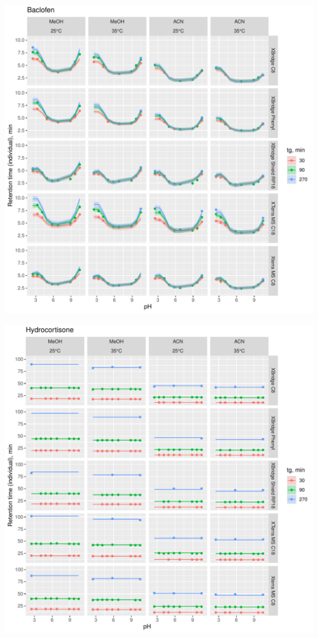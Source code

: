 \documentclass[
]{article}
\begin{document}
\includegraphics{../figures/concordanceplots/Baclofen.individual.pdf}

\newpage{}

\includegraphics{../figures/concordanceplots/Hydrocortisone.individual.pdf}
\end{document}

